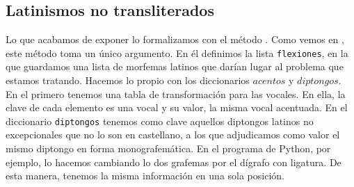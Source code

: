 \subsection{Latinismos no transliterados}
Lo que acabamos de exponer lo formalizamos con el método \Latin. Como vemos en , este método toma un único argumento. En él definimos la lista \texttt{flexiones}, en la que guardamos una lista de morfemas latinos que darían lugar al problema que estamos tratando. Hacemos lo propio con los diccionarios $acentos$ y $diptongos$. En el primero tenemos una tabla de transformación para las vocales. En ella, la clave de cada elemento es una vocal y su valor, la misma vocal acentuada. En el diccionario \texttt{diptongos} tenemos como clave aquellos diptongos latinos no excepcionales que no lo son en castellano, a los que adjudicamos como valor el mismo diptongo en forma monografemática. En el programa de Python, por ejemplo, lo hacemos cambiando lo dos grafemas por el dígrafo con ligatura. De esta manera, tenemos la misma información en una sola posición.

